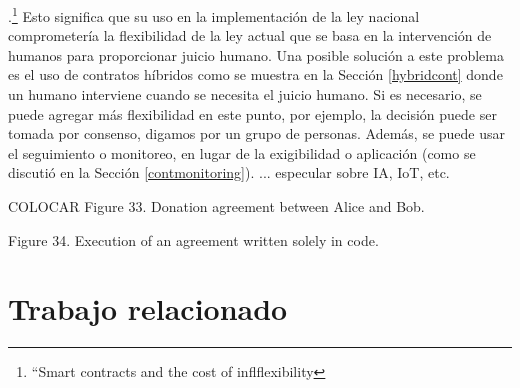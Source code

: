 \documentclass[12pt]{report} %
\begin{document}
.\footnote{\cite{JeremySkla2018}“Smart contracts and the cost of inflflexibility} Esto significa que su uso en la implementación de la ley nacional comprometería la flexibilidad de la ley actual que se basa en la intervención de humanos para proporcionar juicio humano. Una posible solución a este problema es el uso de contratos híbridos como se muestra en la Sección \ref{hybridcont} donde un humano interviene cuando se necesita el juicio humano. Si es necesario, se puede agregar más flexibilidad en este punto, por ejemplo, la decisión puede ser tomada por consenso, digamos por un grupo de personas. Además, se puede usar el seguimiento o monitoreo, en lugar de la exigibilidad o aplicación (como se discutió en la Sección \ref{contmonitoring}).
... especular sobre IA, IoT, etc.

COLOCAR Figure 33. Donation agreement between Alice and Bob.

Figure 34. Execution of an agreement written solely in code.

\section{Trabajo relacionado }
\end{document}
